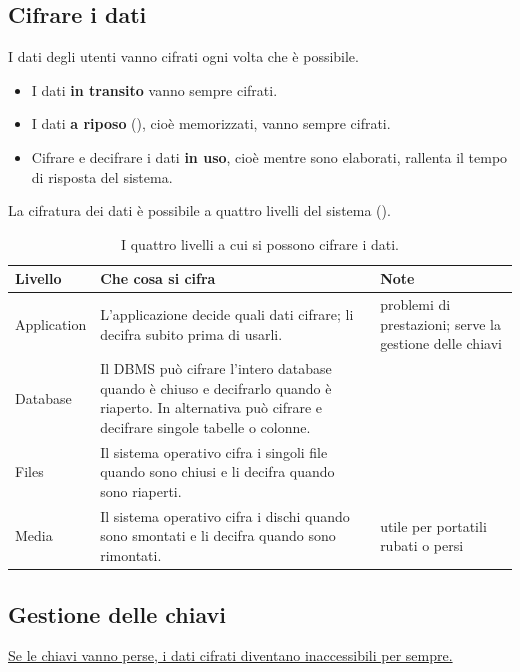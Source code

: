 \subsection{Cifrare i dati}
\label{sec:sic-dati}

I dati degli utenti vanno cifrati ogni volta che è possibile.
\begin{itemize}
  \item I dati \textbf{in transito} vanno sempre cifrati.
  \item I dati \textbf{a riposo} (), cioè memorizzati, vanno sempre cifrati.
  \item Cifrare e decifrare i dati \textbf{in uso}, cioè mentre sono elaborati, rallenta il tempo di risposta del sistema.
\end{itemize}
La cifratura dei dati è possibile a quattro livelli del sistema ().

\begin{table}[ht]
\centering
\small
\caption{I quattro livelli a cui si possono cifrare i dati.}
\label{tab:sic-livelli}
\begin{tabularx}{\linewidth}{>{\raggedright\arraybackslash}p{2.0cm}X>{\raggedright\arraybackslash}p{3.3cm}}
\toprule
Livello & Che cosa si cifra & Note \\
\midrule
Application & L'applicazione decide quali dati cifrare; li decifra subito prima di usarli. & problemi di prestazioni;
  serve la gestione delle chiavi \\
Database & Il DBMS può cifrare l'intero database quando è chiuso e decifrarlo quando è riaperto. In alternativa può
  cifrare e decifrare singole tabelle o colonne. & \\
Files & Il sistema operativo cifra i singoli file quando sono chiusi e li decifra quando sono riaperti. & \\
Media & Il sistema operativo cifra i dischi quando sono smontati e li decifra quando sono rimontati. & utile per
  portatili rubati o persi \\
\bottomrule
\end{tabularx}
\end{table}

\subsection{Gestione delle chiavi}
\label{sec:sic-chiavi}

\begin{attenzione}
\uline{Se le chiavi vanno perse, i dati cifrati diventano inaccessibili per sempre.}
\end{attenzione}

